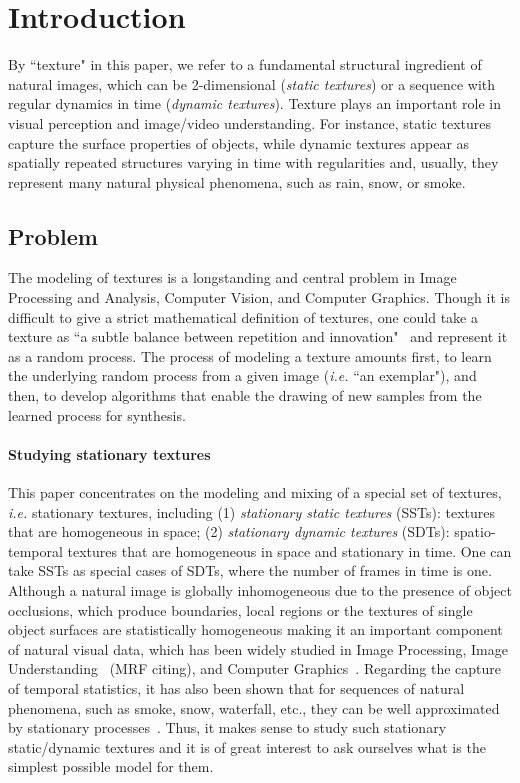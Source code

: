 \section{Introduction}
By ``texture" in this paper, we refer to a fundamental structural ingredient of natural images, which can be 2-dimensional (\emph{static textures}) or a sequence with regular dynamics in time (\emph{dynamic textures}). Texture plays an important role in visual perception and image/video understanding.
For instance, static textures capture the surface properties of objects, while dynamic textures appear as spatially repeated structures varying in time with regularities and, usually, they represent many natural physical phenomena, such as rain, snow, or smoke.

\subsection{Problem}
The modeling of textures is a longstanding and central problem in Image Processing and Analysis, Computer Vision, and Computer Graphics.
Though it is difficult to give a strict mathematical definition of textures, one could take a texture as ``a subtle balance between repetition and innovation"~\cite{MeyerIHP} and represent it as a random process.
The process of modeling a texture amounts first, to learn the underlying random process from a given image (\emph{i.e.} ``an exemplar"), and then, to develop algorithms that enable the drawing of new samples from the learned process for synthesis.

\paragraph{Studying stationary textures}
This paper concentrates on the modeling and mixing of a special set of textures, \emph{i.e.} stationary textures, including
(1) \emph{stationary static textures} (SSTs): textures that are homogeneous in space;
(2) \emph{stationary dynamic textures} (SDTs): spatio-temporal textures that are homogeneous in space and stationary in time. One can take SSTs as special cases of SDTs, where the number of frames in time is one.
Although a natural image is globally inhomogeneous due to the presence of object occlusions, which produce boundaries, local regions or the textures of single object surfaces are statistically homogeneous making it an important component of natural visual data, which has been widely studied in Image Processing, Image Understanding~\cite{GuoZW07} (MRF citing), and Computer Graphics~\cite{efros-nonparam-sampling,WeiLevoy}. Regarding the capture of temporal statistics, it has also been shown that for sequences of natural phenomena, such as smoke, snow, waterfall, etc., they can be well approximated by stationary processes~\cite{dorettoCWS03ijcv}.
Thus, it makes sense to study such stationary static/dynamic textures and it is of great interest to ask ourselves what is the simplest possible model for them.

